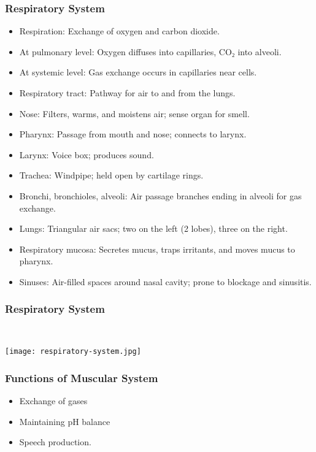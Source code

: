 \begin{frame}[fragile]\frametitle{Respiratory System}

      \begin{itemize}
		\item Respiration: Exchange of oxygen and carbon dioxide.
		\item At pulmonary level: Oxygen diffuses into capillaries, CO₂ into alveoli.
		\item At systemic level: Gas exchange occurs in capillaries near cells.
		\item Respiratory tract: Pathway for air to and from the lungs.
		\item Nose: Filters, warms, and moistens air; sense organ for smell.
		\item Pharynx: Passage from mouth and nose; connects to larynx.
		\item Larynx: Voice box; produces sound.
		\item Trachea: Windpipe; held open by cartilage rings.
		\item Bronchi, bronchioles, alveoli: Air passage branches ending in alveoli for gas exchange.
		\item Lungs: Triangular air sacs; two on the left (2 lobes), three on the right.
		\item Respiratory mucosa: Secretes mucus, traps irritants, and moves mucus to pharynx.
		\item Sinuses: Air-filled spaces around nasal cavity; prone to blockage and sinusitis.
	  \end{itemize}

\end{frame}

\begin{frame}[fragile]\frametitle{Respiratory System}
\
		\begin{center}
		\texttt{[image: respiratory-system.jpg]}
		\end{center}	

\end{frame}
\begin{frame}[fragile]\frametitle{Functions of Muscular System }

      \begin{itemize}
		\item Exchange of gases
		\item Maintaining pH balance
		\item Speech production.
	  \end{itemize}

\end{frame}
	
